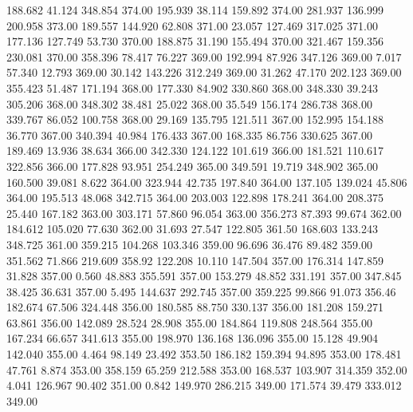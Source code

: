  188.682   41.124  348.854       374.00
 195.939   38.114  159.892       374.00
 281.937  136.999  200.958       373.00
 189.557  144.920   62.808       371.00
  23.057  127.469  317.025       371.00
 177.136  127.749   53.730       370.00
 188.875   31.190  155.494       370.00
 321.467  159.356  230.081       370.00
 358.396   78.417   76.227       369.00
 192.994   87.926  347.126       369.00
   7.017   57.340   12.793       369.00
  30.142  143.226  312.249       369.00
  31.262   47.170  202.123       369.00
 355.423   51.487  171.194       368.00
 177.330   84.902  330.860       368.00
 348.330   39.243  305.206       368.00
 348.302   38.481   25.022       368.00
  35.549  156.174  286.738       368.00
 339.767   86.052  100.758       368.00
  29.169  135.795  121.511       367.00
 152.995  154.188   36.770       367.00
 340.394   40.984  176.433       367.00
 168.335   86.756  330.625       367.00
 189.469   13.936   38.634       366.00
 342.330  124.122  101.619       366.00
 181.521  110.617  322.856       366.00
 177.828   93.951  254.249       365.00
 349.591   19.719  348.902       365.00
 160.500   39.081    8.622       364.00
 323.944   42.735  197.840       364.00
 137.105  139.024   45.806       364.00
 195.513   48.068  342.715       364.00
 203.003  122.898  178.241       364.00
 208.375   25.440  167.182       363.00
 303.171   57.860   96.054       363.00
 356.273   87.393   99.674       362.00
 184.612  105.020   77.630       362.00
  31.693   27.547  122.805       361.50
 168.603  133.243  348.725       361.00
 359.215  104.268  103.346       359.00
  96.696   36.476   89.482       359.00
 351.562   71.866  219.609       358.92
 122.208   10.110  147.504       357.00
 176.314  147.859   31.828       357.00
   0.560   48.883  355.591       357.00
 153.279   48.852  331.191       357.00
 347.845   38.425   36.631       357.00
   5.495  144.637  292.745       357.00
 359.225   99.866   91.073       356.46
 182.674   67.506  324.448       356.00
 180.585   88.750  330.137       356.00
 181.208  159.271   63.861       356.00
 142.089   28.524   28.908       355.00
 184.864  119.808  248.564       355.00
 167.234   66.657  341.613       355.00
 198.970  136.168  136.096       355.00
  15.128   49.904  142.040       355.00
   4.464   98.149   23.492       353.50
 186.182  159.394   94.895       353.00
 178.481   47.761    8.874       353.00
 358.159   65.259  212.588       353.00
 168.537  103.907  314.359       352.00
   4.041  126.967   90.402       351.00
   0.842  149.970  286.215       349.00
 171.574   39.479  333.012       349.00
